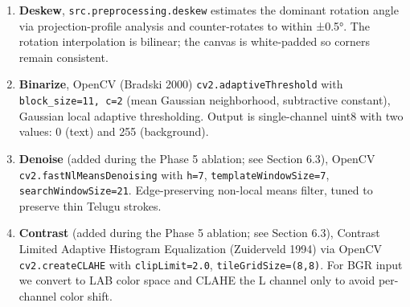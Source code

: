 \documentclass[
  letterpaper,
  DIV=11,
  numbers=noendperiod]{scrartcl}
\providecommand{\tightlist}{%
  \setlength{\itemsep}{0pt}\setlength{\parskip}{0pt}}
\begin{document}
\begin{enumerate}
\def\labelenumi{\arabic{enumi}.}
\tightlist
\item
  \textbf{Deskew}, \texttt{src.preprocessing.deskew} estimates the
  dominant rotation angle via projection-profile analysis and
  counter-rotates to within ±0.5°. The rotation interpolation is
  bilinear; the canvas is white-padded so corners remain consistent.
\item
  \textbf{Binarize}, OpenCV (Bradski 2000)
  \texttt{cv2.adaptiveThreshold} with \texttt{block\_size=11,\ c=2}
  (mean Gaussian neighborhood, subtractive constant), Gaussian local
  adaptive thresholding. Output is single-channel uint8 with two values:
  0 (text) and 255 (background).
\item
  \textbf{Denoise} (added during the Phase 5 ablation; see Section 6.3),
  OpenCV \texttt{cv2.fastNlMeansDenoising} with \texttt{h=7},
  \texttt{templateWindowSize=7}, \texttt{searchWindowSize=21}.
  Edge-preserving non-local means filter, tuned to preserve thin Telugu
  strokes.
\item
  \textbf{Contrast} (added during the Phase 5 ablation; see Section
  6.3), Contrast Limited Adaptive Histogram Equalization (Zuiderveld
  1994) via OpenCV \texttt{cv2.createCLAHE} with \texttt{clipLimit=2.0},
  \texttt{tileGridSize=(8,8)}. For BGR input we convert to LAB color
  space and CLAHE the L channel only to avoid per-channel color shift.
\end{enumerate}
\end{document}
